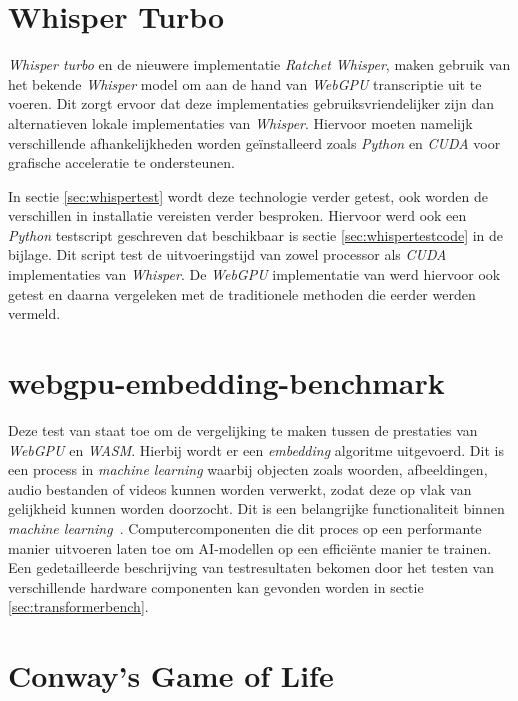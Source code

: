 \section{Whisper Turbo}

\textit{Whisper turbo} en de nieuwere implementatie \textit{Ratchet Whisper}, maken gebruik van het bekende \textit{Whisper} model om aan de hand van \textit{WebGPU} transcriptie uit te voeren. Dit zorgt ervoor dat deze implementaties  gebruiksvriendelijker zijn dan alternatieven lokale implementaties van \textit{Whisper}. Hiervoor moeten namelijk verschillende afhankelijkheden worden geïnstalleerd zoals \textit{Python} en \textit{CUDA} voor grafische acceleratie te ondersteunen. 

\bigbreak{}

In sectie \ref{sec:whispertest} wordt deze technologie verder getest, ook worden de verschillen in installatie vereisten verder besproken. Hiervoor werd ook een \textit{Python} testscript geschreven dat beschikbaar is sectie \ref{sec:whispertestcode} in de bijlage. Dit script test de uitvoeringstijd van zowel processor als \textit{CUDA} implementaties van \textit{Whisper}. De \textit{WebGPU} implementatie van \textcite{Fleetwood2024} werd hiervoor ook getest en daarna vergeleken met de traditionele methoden die eerder werden vermeld.

\section{webgpu-embedding-benchmark}

Deze test van \textcite{Lochner2024} staat toe om de vergelijking te maken tussen de prestaties van \textit{WebGPU} en \textit{WASM}. Hierbij wordt er een \textit{embedding} algoritme uitgevoerd. Dit is een process in \textit{machine learning} waarbij objecten zoals woorden, afbeeldingen, audio bestanden of videos kunnen worden verwerkt, zodat deze op vlak van gelijkheid kunnen worden doorzocht. Dit is een belangrijke functionaliteit binnen \textit{machine learning}~\autocite{Cloudflare2024}. Computercomponenten die dit proces op een performante manier uitvoeren laten toe om AI-modellen op een efficiënte manier te trainen. Een gedetailleerde beschrijving van testresultaten bekomen door het testen van verschillende hardware componenten kan gevonden worden in sectie \ref{sec:transformerbench}.

\section{Conway's Game of Life}

